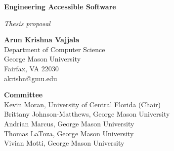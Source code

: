 \documentclass[12pt]{article}
\begin{document}
\pagestyle{plain}

\begin{titlepage}
   \begin{center}
       \vspace*{1cm}

       \textbf{\LARGE Engineering Accessible Software}

       \vspace{2.5cm}
        \textit{Thesis proposal} 
        
       \vspace{2.5cm}

       {\bf Arun Krishna Vajjala}  \\
Department of Computer Science \\
George Mason University\\
Fairfax, VA 22030\\
 akrishn@gmu.edu \\

\vfill
            
\textbf{Committee}\\
Kevin Moran, University of Central Florida (Chair)\\
Brittany Johnson-Matthews, George Mason University \\
Andrian Marcus, George Mason University \\ 
Thomas LaToza, George Mason University \\
Vivian Motti, George Mason University \\
    
\vspace{0.8cm}
 
    
\date{\today}
\end{center}
\end{titlepage}

\pagebreak
\end{document}
